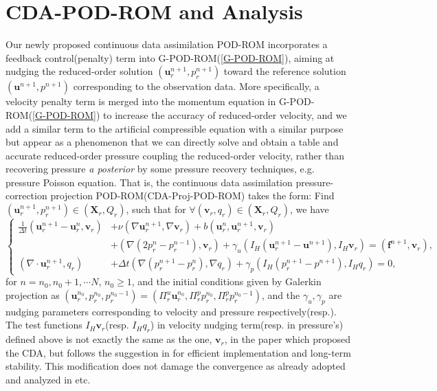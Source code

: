 \documentclass[10pt,twoside,openany,UTF8,CJK]{article}
\begin{document}
    \section{CDA-POD-ROM and Analysis}\label{section-3}
    \indent Our newly proposed continuous data assimilation POD-ROM incorporates a feedback control(penalty) term into G-POD-ROM(\ref{G-POD-ROM}), aiming at nudging the reduced-order solution $(\boldsymbol{u}_r^{n+1}, p_r^{n+1})$ toward the reference solution $(\boldsymbol{u}^{n+1}, p^{n+1})$ corresponding to the observation data. More specifically, a velocity penalty term is merged into the momentum equation in G-POD-ROM(\ref{G-POD-ROM}) to increase the accuracy of reduced-order velocity, and we add a similar term to the artificial compressible equation with a similar purpose but appear as a phenomenon that we can directly solve and obtain a table and accurate reduced-order pressure coupling the reduced-order velocity, rather than recovering pressure \textit{a posterior} by some pressure recovery techniques, e.g. pressure Poisson equation\cite{NS-POD-2014-JCP}. That is, the continuous data assimilation pressure-correction projection POD-ROM(CDA-Proj-POD-ROM) takes the form: Find $(\boldsymbol{u}_r^{n+1}, p_r^{n+1}) \in (\boldsymbol{X}_r, Q_r)$, such that for $\forall (\boldsymbol{v}_r, q_r) \in (\boldsymbol{X}_r, Q_r)$, we have
    \begin{equation}\label{CDA-Proj-POD-ROM}
    	\left\{
    	\begin{aligned}
    		\frac{1}{\Delta t}\left(\boldsymbol{u}_r^{n+1}-\boldsymbol{u}_r^n, \boldsymbol{v}_r\right) &+ \nu\left(\nabla \boldsymbol{u}_r^{n+1}, \nabla \boldsymbol{v}_r\right) + b\left(\boldsymbol{u}_r^n,\boldsymbol{u}_r^{n+1},\boldsymbol{v}_r\right) \\
    		&+ \left(\nabla\left(2 p_r^n-p_r^{n-1}\right), \boldsymbol{v}_r\right) + \gamma_u(I_H(\boldsymbol{u}_r^{n+1} - \boldsymbol{u}^{n+1}), I_H\boldsymbol{v}_r) =\left(\boldsymbol{f}^{n+1}, \boldsymbol{v}_r\right), \\
    		\left(\nabla \cdot \boldsymbol{u}_r^{n+1}, q_r\right) &+ \Delta t\left(\nabla\left(p_r^{n+1}-p_r^n\right), \nabla q_r\right) + \gamma_p(I_H(p_r^{n+1} - p^{n+1}), I_Hq_r) = 0,
    	\end{aligned}
    	\right.
    \end{equation}
	for $n=n_0,n_0+1,\cdots N$, $n_0 \geq 1$, and the initial conditions given by Galerkin projection as $(\boldsymbol{u}_r^{n_0}, p_r^{n_0}, p_r^{n_0-1}) = (\Pi^u_r\boldsymbol{u}_r^{n_0}, \Pi^p_rp_r^{n_0}, \Pi^p_rp_r^{n_0-1})$, and the $\gamma_u,\gamma_p$ are nudging parameters corresponding to velocity and pressure respectively(resp.).  \\
	\indent The test functions $I_H\boldsymbol{v}_r$(resp. $I_Hq_r$) in velocity nudging term(resp. in pressure's) defined above is not exactly the same as the one, $\boldsymbol{v}_r$, in the paper which proposed the CDA\cite{CDA-2014-JNS}, but follows the suggestion in \cite{CDA-2021-NMPDE} for efficient implementation and long-term stability. This modification does not damage the convergence as already adopted and analyzed in \cite{CDA-2019-CMAME,CDA-ACM-2020,CDA-SINUM-2020} etc. 
\end{document}
